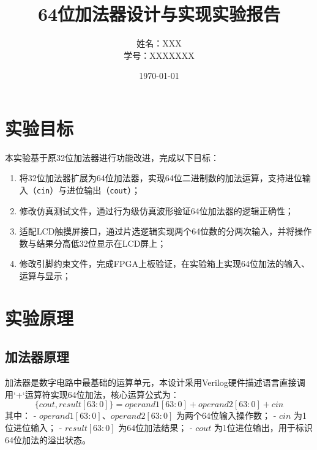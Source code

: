 \documentclass[12pt,a4paper,UTF8]{ctexart}
\title{\bfseries 64位加法器设计与实现实验报告}
\author{姓名：XXX \\ 学号：XXXXXXX}
\date{\today}
\begin{document}
\maketitle
\thispagestyle{empty} %
\newpage
\setcounter{page}{1} %

\section{实验目标}
本实验基于原32位加法器进行功能改进，完成以下目标：
\begin{enumerate}[label=\arabic*.]
    \item 将32位加法器扩展为64位加法器，实现64位二进制数的加法运算，支持进位输入（\texttt{cin}）与进位输出（\texttt{cout}）；
    \item 修改仿真测试文件，通过行为级仿真波形验证64位加法器的逻辑正确性；
    \item 适配LCD触摸屏接口，通过片选逻辑实现两个64位数的分两次输入，并将操作数与结果分高低32位显示在LCD屏上；
    \item 修改引脚约束文件，完成FPGA上板验证，在实验箱上实现64位加法的输入、运算与显示；
\end{enumerate}

\section{实验原理}
\subsection{加法器原理}
加法器是数字电路中最基础的运算单元，本设计采用Verilog硬件描述语言直接调用`+`运算符实现64位加法，核心运算公式为：
\[
\{cout, result[63:0]\} = operand1[63:0] + operand2[63:0] + cin
\]
其中：
- \(operand1[63:0]\)、\(operand2[63:0]\) 为两个64位输入操作数；
- \(cin\) 为1位进位输入；
- \(result[63:0]\) 为64位加法结果；
- \(cout\) 为1位进位输出，用于标识64位加法的溢出状态。
\end{document}
